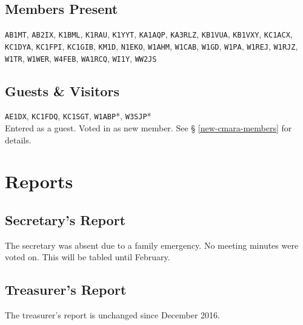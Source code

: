 \documentclass[10pt,letterpaper]{article}
\begin{document}
\subsection{Members Present}
\texttt{AB1MT},
\texttt{AB2IX},
\texttt{K1BML},
\texttt{K1RAU},
\texttt{K1YYT},
\texttt{KA1AQP},
\texttt{KA3RLZ},
\texttt{KB1VUA},
\texttt{KB1VXY},
\texttt{KC1ACX},
\texttt{KC1DYA},
\texttt{KC1FPI},
\texttt{KC1GIB},
\texttt{KM1D},
\texttt{N1EKO},
\texttt{W1AHM},
\texttt{W1CAB},
\texttt{W1GD},
\texttt{W1PA},
\texttt{W1REJ},
\texttt{W1RJZ},
\texttt{W1TR},
\texttt{W1WER},
\texttt{W4FEB},
\texttt{WA1RCQ},
\texttt{WI1Y},
\texttt{WW2JS}

\subsection{Guests \& Visitors}

\texttt{AE1DX},
\texttt{KC1FDQ},
\texttt{KC1SGT},
\texttt{W1ABP}*,
\texttt{W3SJP}*\\

\noindent
\textasteriskcentered{} Entered as a guest. Voted in as new member. See \S{} \ref{new-cmara-members} for details.

\section{Reports}

\subsection{Secretary's Report}
The secretary was absent due to a family emergency. No meeting minutes were voted on. This will be tabled until February.

\newpage
\subsection{Treasurer's Report}
The treasurer's report is unchanged since December 2016.
\end{document}
